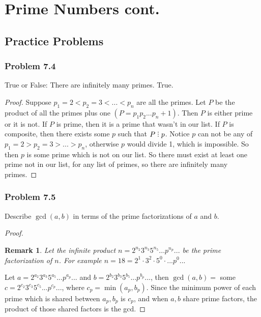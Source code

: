 \documentclass[hidelinks,12pt]{article}
\newtheorem*{remark}{Remark}
\newcommand{\divby}{%
  \mathrel{\text{\vbox{\baselineskip.65ex\lineskiplimit0pt\hbox{.}\hbox{.}\hbox{.}}}}%
  }
\begin{document}
\section{Prime Numbers cont.}
\subsection{Practice Problems}
\subsubsection{Problem 7.4}
True or False: There are infinitely many primes.
\newline True.\begin{proof}
Suppose $p_1=2<p_2=3<...<p_n$ are all the primes. Let $P$ be the product of all the primes plus one $(P=p_1p_2...p_n+1)$. Then $P$ is either prime or it is not. If $P$ is prime, then it is a prime that wasn't in our list. If $P$ is composite, then there exists some $p$ such that $P\divby p$. Notice $p$ can not be any of $p_1=2>p_2=3>...>p_n$, otherwise $p$ would divide 1, which is impossible. So then $p$ is some prime which is not on our list. So there must exist at least one prime not in our list, for any list of primes, so there are infinitely many primes.
\end{proof}
\subsubsection{Problem 7.5}
Describe $\gcd(a,b)$ in terms of the prime factorizations of $a$ and $b$.
\begin{proof}
\begin{remark}Let the infinite product $n=2^{n_2}3^{n_3}5^{n_5}...p^{n_p}...$ be the prime factorization of $n$. For example $n=18=2^1\cdot3^2\cdot5^0\cdot...p^0...$ \end{remark}
Let $a=2^{a_2}3^{a_3}5^{a_5}...p^{a_p}...$ and $b=2^{b_2}3^{b_3}5^{b_5}...p^{b_p}...$, then $\gcd(a,b)=$ some $c=2^{c_2}3^{c_3}5^{c_5}...p^{c_p}...$, where $c_p=\min(a_p,b_p)$. Since the minimum power of each prime which is shared between $a_p,b_p$ is $c_p$, and when $a,b$ share prime factors, the product of those shared factors is the gcd.
\end{proof}
\end{document}

